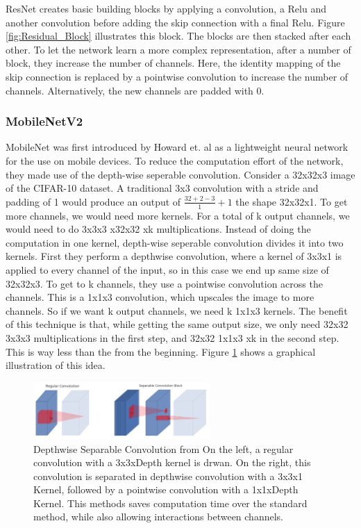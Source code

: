 ResNet creates basic building blocks by applying a convolution, a Relu and
another convolution before adding the skip connection with a final Relu. Figure
\ref{fig:Residual_Block} illustrates this block. The blocks are then stacked
after each other. To let the network learn a more complex representation, after
a number of block, they increase the number of channels. Here, the identity
mapping of the skip connection is replaced by a pointwise convolution to
increase the number of channels. Alternatively, the new channels are padded with
0.



\subsubsection{MobileNetV2}
MobileNet was first introduced by Howard et. al \cite{howard2017mobilenets} as a
lightweight neural network for the use on mobile devices. To reduce the
computation effort of the network, they made use of the depth-wise seperable
convolution. Consider a 32x32x3 image of the CIFAR-10 dataset. A traditional 3x3
convolution with a stride and padding of 1 would produce an output of
$\frac{32+2-3}{1}+1$ the shape 32x32x1. To get more channels, we would need more
kernels. For a total of k output channels, we would need to do 3x3x3 x32x32 xk
multiplications. Instead of doing the computation in one kernel, depth-wise
seperable convolution divides it into two kernels. First they perform a
depthwise convolution, where a kernel of 3x3x1 is applied to every channel of
the input, so in this case we end up same size of 32x32x3. To get to k channels,
they use a pointwise convolution across the channels. This is a 1x1x3
convolution, which upscales the image to more channels. So if we want k output
channels, we need k 1x1x3 kernels. The benefit of this technique is that, while
getting the same output size, we only need 32x32 3x3x3 multiplications in the
first step, and 32x32 1x1x3 xk in the second step. This is way less than the
from the beginning. Figure \ref{fig:DSConv} shows a graphical illustration of
this idea.
\begin{figure}[h!]\label{fig:DSConv}
    \centering
    \includegraphics[width=0.6\textwidth]{images/Depthwise_Separable_Convolution.png}
    \caption{Depthwise Separable Convolution from \cite[Page 3]{sandler2018mobilenetv2} \newline On the left,
     a regular convolution with a 3x3xDepth kernel is drwan. On the right, this
     convolution is separated in depthwise convolution with a 3x3x1 Kernel,
     followed by a pointwise convolution with a 1x1xDepth Kernel. This methods
     saves computation time over the standard method, while also allowing
     interactions between channels.}
\end{figure}


